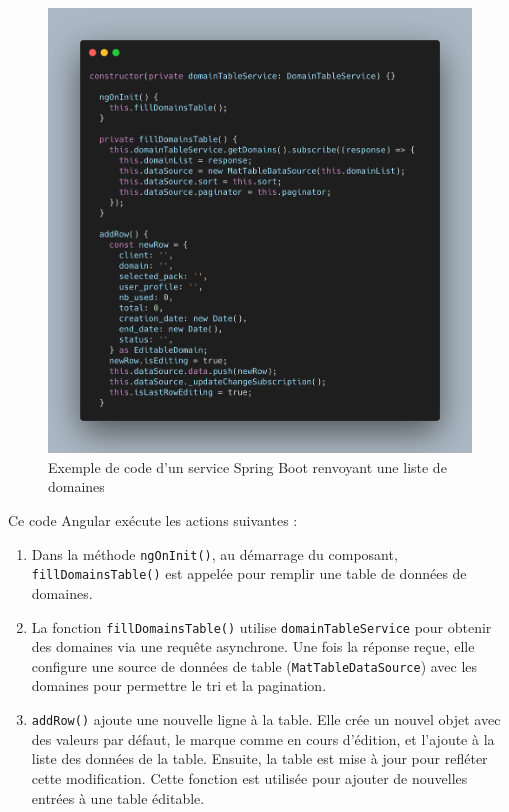 \documentclass[a4paper, 11pt]{report}
\begin{document}
  \begin{figure}[H]
      \centering
      \includegraphics[scale=0.45,center]{screenshots/js-code}
      \caption{Exemple de code d'un service Spring Boot renvoyant une liste de domaines}
  \end{figure}
Ce code Angular exécute les actions suivantes :
\begin{enumerate}
\def\labelenumi{\arabic{enumi}.}
\item
  Dans la méthode \texttt{ngOnInit()}, au démarrage du composant,
  \texttt{fillDomainsTable()} est appelée pour remplir une table de
  données de domaines.
\item
  La fonction \texttt{fillDomainsTable()} utilise
  \texttt{domainTableService} pour obtenir des domaines via une requête
  asynchrone. Une fois la réponse reçue, elle configure une source de
  données de table (\texttt{MatTableDataSource}) avec les domaines pour
  permettre le tri et la pagination.
\item
  \texttt{addRow()} ajoute une nouvelle ligne à la table. Elle crée un
  nouvel objet avec des valeurs par défaut, le marque comme en cours
  d'édition, et l'ajoute à la liste des données de la table. Ensuite, la
  table est mise à jour pour refléter cette modification. Cette fonction
  est utilisée pour ajouter de nouvelles entrées à une table éditable.
\end{enumerate}
\end{document}
